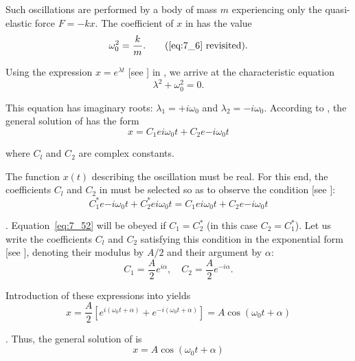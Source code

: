 \noindent
Such oscillations are performed by a body of mass $m$ experiencing only the quasi-elastic force $F=-kx$. The coefficient of $x$ in  has the value
\begin{equation*}
	\omega_0^2 = \frac{k}{m}.\tag{\ref{eq:7_6} revisited}.
\end{equation*}

Using the expression $x=e^{\lambda t}$ [see ] in , we arrive at the characteristic equation
\begin{equation}\label{eq:7_50}
	\lambda^2 + \omega_0^2 = 0.
\end{equation}

\noindent
This equation has imaginary roots: $\lambda_1=+i\omega_0$ and $\lambda_2=-i\omega_0$. According to , the general solution of  has the form
\begin{equation}\label{eq:7_51}
	x = C_1 e{i\omega_0 t} + C_2 e{-i\omega_0 t}
\end{equation}

\noindent
where $C_l$ and $C_2$ are complex constants.

The function $x(t)$ describing the oscillation must be real. For this end, the coefficients $C_l$ and $C_2$ in  must be selected so as to observe the condition [see ]:
\begin{equation}\label{eq:7_52}
	C_1^* e{-i\omega_0 t} + C_2^* e{i\omega_0 t} = C_1 e{i\omega_0 t} + C_2 e{-i\omega_0 t}
\end{equation}

. Equation~\eqref{eq:7_52} will be obeyed if $C_1=C_2^*$ (in this case $C_2=C_1^*$). Let us write the coefficients $C_l$ and $C_2$ satisfying this condition in the exponential form [see ], denoting their modulus by $A/2$ and their argument by $\alpha$:
\begin{equation}\label{eq:7_53}
	C_1 = \frac{A}{2}e^{i\alpha},\quad 	C_2 = \frac{A}{2}e^{-i\alpha}.
\end{equation}

\noindent
Introduction of these expressions into  yields
\begin{equation}\label{eq:7_54}
	x = \frac{A}{2}\left[e^{i(\omega_0 t+\alpha)} + e^{-i(\omega_0 t+\alpha)}\right] = A\cos(\omega_0 t + \alpha)
\end{equation}

. Thus, the general solution of  is
\begin{equation}\label{eq:7_55}
	x = A\cos(\omega_0 t + \alpha)
\end{equation}
	
